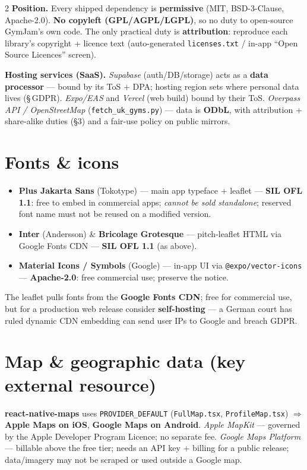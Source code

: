 \documentclass[a4paper,8pt]{extarticle}
\newcommand{\lic}[1]{\textbf{#1}}
\begin{document}
\begin{multicols}{2}
\smallskip
\textbf{Position.} Every shipped dependency is \lic{permissive} (MIT, BSD-3-Clause, Apache-2.0). \textbf{No copyleft (GPL/AGPL/LGPL)}, so no duty to open-source GymJam's own code. The only practical duty is \textbf{attribution}: reproduce each library's copyright + licence text (auto-generated \texttt{licenses.txt} / in-app ``Open Source Licences'' screen).

\smallskip
\textbf{Hosting services (SaaS).} \emph{Supabase} (auth/DB/storage) acts as a \textbf{data processor} --- bound by its ToS + DPA; hosting region sets where personal data lives (\S\,GDPR). \emph{Expo/EAS} and \emph{Vercel} (web build) bound by their ToS. \emph{Overpass API / OpenStreetMap} (\texttt{fetch\_uk\_gyms.py}) --- data is \lic{ODbL}, with attribution + share-alike duties (\S3) and a fair-use policy on public mirrors.

\section{Fonts \& icons}

\begin{itemize}[leftmargin=1em,itemsep=0pt,topsep=1pt]
\item \textbf{Plus Jakarta Sans} (Tokotype) --- main app typeface + leaflet --- \lic{SIL OFL 1.1}: free to embed in commercial apps; \emph{cannot be sold standalone}; reserved font name must not be reused on a modified version.
\item \textbf{Inter} (Andersson) \& \textbf{Bricolage Grotesque} --- pitch-leaflet HTML via Google Fonts CDN --- \lic{SIL OFL 1.1} (as above).
\item \textbf{Material Icons / Symbols} (Google) --- in-app UI via \texttt{@expo/vector-icons} --- \lic{Apache-2.0}: free commercial use; preserve the notice.
\end{itemize}
The leaflet pulls fonts from the \textbf{Google Fonts CDN}; free for commercial use, but for a production web release consider \textbf{self-hosting} --- a German court has ruled dynamic CDN embedding can send user IPs to Google and breach GDPR.

\section{Map \& geographic data (key external resource)}

\textbf{react-native-maps} uses \texttt{PROVIDER\_DEFAULT} (\texttt{FullMap.tsx}, \texttt{ProfileMap.tsx}) $\Rightarrow$ \textbf{Apple Maps on iOS}, \textbf{Google Maps on Android}.
\emph{Apple MapKit} --- governed by the Apple Developer Program Licence; no separate fee.
\emph{Google Maps Platform} --- billable above the free tier; needs an API key + billing for a public release; data/imagery may not be scraped or used outside a Google map.


\end{multicols}
\end{document}
